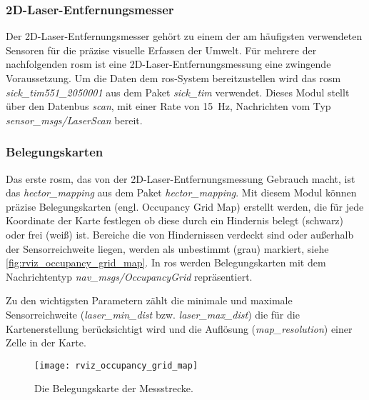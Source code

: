 \begin{comment}
--------------------------------------------------------------------------------
- \url{http://wiki.ros.org/sick_tim}
\end{comment}
\subsubsection{2D-Laser-Entfernungsmesser}

Der 2D-Laser-Entfernungsmesser gehört zu einem der am häufigsten verwendeten Sensoren für die präzise visuelle Erfassen der Umwelt. Für mehrere der nachfolgenden \Gls{rosm} ist eine 2D-Laser-Entfernungsmessung eine zwingende Voraussetzung. Um die Daten dem \Gls{ros}-System bereitzustellen wird das \Gls{rosm} \textit{sick\_tim551\_2050001} aus dem Paket \textit{sick\_tim} verwendet. Dieses Modul stellt über den Datenbus \textit{scan}, mit einer Rate von \SI{15}{\hertz}, Nachrichten vom Typ \textit{sensor\_msgs/LaserScan} bereit.


\begin{comment}
--------------------------------------------------------------------------------
- \url{http://wiki.ros.org/hector_mapping}
\end{comment}
\subsubsection{Belegungskarten}

Das erste \Gls{rosm}, das von der 2D-Laser-Entfernungsmessung Gebrauch macht, ist das \textit{hector\_mapping} aus dem Paket \textit{hector\_mapping}. Mit diesem Modul können präzise Belegungskarten (engl. Occupancy Grid Map) erstellt werden, die für jede Koordinate der Karte festlegen ob diese durch ein Hindernis belegt (schwarz) oder frei (weiß) ist. Bereiche die von Hindernissen verdeckt sind oder außerhalb der Sensorreichweite liegen, werden als unbestimmt (grau) markiert, siehe \autoref{fig:rviz_occupancy_grid_map}. In \Gls{ros} werden Belegungskarten mit dem Nachrichtentyp \textit{nav\_msgs/OccupancyGrid} repräsentiert.

Zu den wichtigsten Parametern zählt die minimale und maximale Sensorreichweite (\textit{laser\_min\_dist} bzw. \textit{laser\_max\_dist}) die für die Kartenerstellung berücksichtigt wird und die Auflösung (\textit{map\_resolution}) einer Zelle in der Karte.

\begin{figure}[h]
	\centering
	\texttt{[image: rviz\_occupancy\_grid\_map]}
	\caption{Die Belegungskarte der Messstrecke.}
	\label{fig:rviz_occupancy_grid_map}
\end{figure}
 

